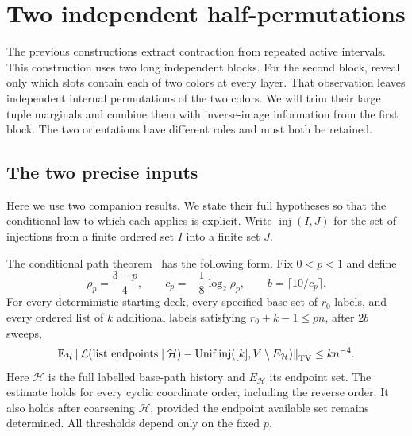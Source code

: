 \section{Two independent half-permutations}\label{sec:two-halves}

The previous constructions extract contraction from repeated active intervals. This construction uses two long independent blocks. For the second block, reveal only which slots contain each of two colors at every layer. That observation leaves independent internal permutations of the two colors. We will trim their large tuple marginals and combine them with inverse-image information from the first block. The two orientations have different roles and must both be retained.

\subsection{The two precise inputs}

Here we use two companion results. We state their full hypotheses so that the conditional law to which each applies is explicit. Write $\operatorname{inj}(I,J)$ for the set of injections from a finite ordered set $I$ into a finite set $J$.

The conditional path theorem~\cite[Theorem~4.1]{conditional-information} has the following form. Fix $0<p<1$ and define
\begin{equation}\label{eq:tabloid-parameters}
 \rho_p=\frac{3+p}{4},\qquad c_p=-\frac18\log_2\rho_p,
 \qquad b=\lceil10/c_p\rceil.
\end{equation}
For every deterministic starting deck, every specified base set of $r_0$ labels, and every ordered list of $k$ additional labels satisfying $r_0+k-1\le pn$, after $2b$ sweeps,
\begin{equation}\label{eq:conditional-input}
 \mathbb E_{\mathcal H}\left\|
 \mathcal L(\text{list endpoints}\mid\mathcal H)
 -\operatorname{Unif}\operatorname{inj}([k],V\setminus E_{\mathcal H})
 \right\|_{\mathrm{TV}}\le k n^{-4}.
\end{equation}
Here $\mathcal H$ is the full labelled base-path history and $E_{\mathcal H}$ its endpoint set. The estimate holds for every cyclic coordinate order, including the reverse order. It also holds after coarsening $\mathcal H$, provided the endpoint available set remains determined. All thresholds depend only on the fixed $p$.

